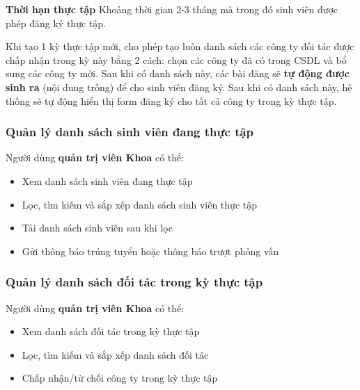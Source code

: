 \documentclass[./../main.tex]{subfiles}
\begin{document}
\textbf{Thời hạn thực tập} Khoảng thời gian 2-3 tháng mà trong đó sinh
viên được phép đăng ký thực tập.


Khi tạo 1 kỳ thực tập mới, cho phép tạo luôn danh sách các công ty đối
tác được chấp nhận trong kỳ này bằng 2 cách: chọn các công ty đã có
trong CSDL và bổ sung các công ty mới. Sau khi có danh sách này, các bài
đăng sẽ \textbf{tự động được sinh ra} (nội dung trống) để cho sinh viên
đăng ký. Sau khi có danh sách này, hệ thống sẽ tự động hiển thị form
đăng ký cho tất cả công ty trong kỳ thực tập.

\hypertarget{quux1ea3n-luxfd-danh-suxe1ch-sinh-viuxean-ux111ang-thux1ef1c-tux1eadp}{%
	\subsubsection{Quản lý danh sách sinh viên đang thực
		tập}\label{quux1ea3n-luxfd-danh-suxe1ch-sinh-viuxean-ux111ang-thux1ef1c-tux1eadp}}

Người dùng \textbf{quản trị viên Khoa} có thể:

\begin{itemize}
	\item

	      Xem danh sách sinh viên đang thực tập

	\item

	      Lọc, tìm kiếm và sắp xếp danh sách sinh viên thực tập

	\item

	      Tải danh sách sinh viên sau khi lọc

	\item

	      Gửi thông báo trúng tuyển hoặc thông báo trượt phỏng vấn

\end{itemize}

\hypertarget{quux1ea3n-luxfd-danh-suxe1ch-ux111ux1ed1i-tuxe1c-trong-kux1ef3-thux1ef1c-tux1eadp}{%
	\subsubsection{Quản lý danh sách đối tác trong kỳ thực
		tập}\label{quux1ea3n-luxfd-danh-suxe1ch-ux111ux1ed1i-tuxe1c-trong-kux1ef3-thux1ef1c-tux1eadp}}

Người dùng \textbf{quản trị viên Khoa} có thể:

\begin{itemize}
	\item

	      Xem danh sách đối tác trong kỳ thực tập

	\item

	      Lọc, tìm kiếm và sắp xếp danh sách đối tác

	\item

	      Chấp nhận/từ chối công ty trong kỳ thực tập

\end{itemize}
\end{document}

